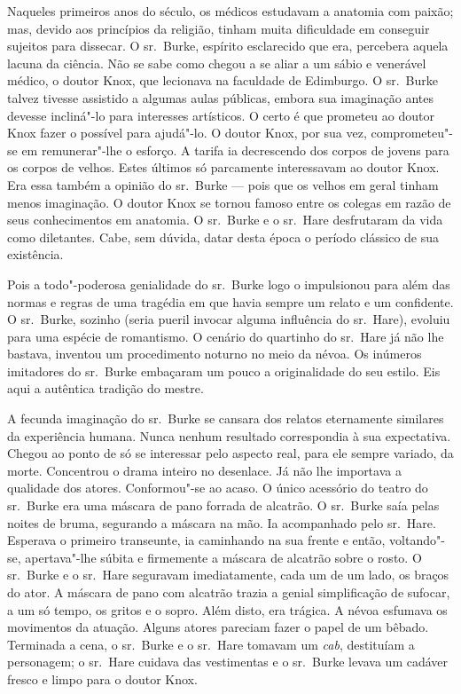 Naqueles primeiros anos do século, os médicos estudavam a anatomia com
paixão; mas, devido aos princípios da religião, tinham muita dificuldade
em conseguir sujeitos para dissecar. O sr.~Burke, espírito esclarecido que
era, percebera aquela lacuna da ciência. Não se sabe como chegou a se
aliar a um sábio e venerável médico, o doutor Knox, que lecionava na
faculdade de Edimburgo. O sr.~Burke talvez tivesse assistido a algumas
aulas públicas, embora sua imaginação antes devesse incliná"-lo para
interesses artísticos. O certo é que prometeu ao doutor Knox fazer o
possível para ajudá"-lo. O doutor Knox, por sua vez, comprometeu"-se em
remunerar"-lhe o esforço. A tarifa ia decrescendo dos corpos de jovens para
os corpos de velhos. Estes últimos só parcamente interessavam ao doutor
Knox. Era essa também a opinião do sr.~Burke --- pois que os velhos em geral
tinham menos imaginação. O doutor Knox se tornou famoso entre os colegas
em razão de seus conhecimentos em anatomia. O sr.~Burke e o sr.~Hare
desfrutaram da vida como diletantes. Cabe, sem dúvida, datar desta época o
período clássico de sua existência.

Pois a todo"-poderosa genialidade do sr.~Burke logo o impulsionou para além
das normas e regras de uma tragédia em que havia sempre um relato e um
confidente. O sr.~Burke, sozinho (seria pueril invocar alguma influência
do sr.~Hare), evoluiu para uma espécie de romantismo. O cenário do
quartinho do sr.~Hare já não lhe bastava, inventou um procedimento noturno
no meio da névoa. Os inúmeros imitadores do sr.~Burke embaçaram um pouco a
originalidade do seu estilo. Eis aqui a autêntica tradição do mestre.

A fecunda imaginação do sr.~Burke se cansara dos relatos eternamente
similares da experiência humana. Nunca nenhum resultado correspondia à sua
expectativa. Chegou ao ponto de só se interessar pelo aspecto real, para
ele sempre variado, da morte. Concentrou o drama inteiro no desenlace. Já
não lhe importava a qualidade dos atores. Conformou"-se ao acaso. O único
acessório do teatro do sr.~Burke era uma máscara de pano forrada de
alcatrão. O sr.~Burke saía pelas noites de bruma, segurando a máscara na
mão. Ia acompanhado pelo sr.~Hare. Esperava o primeiro transeunte, ia
caminhando na sua frente e então, voltando"-se, apertava"-lhe súbita e
firmemente a máscara de alcatrão sobre o rosto. O sr.~Burke e o sr.~Hare
seguravam imediatamente, cada um de um lado, os braços do ator. A máscara
de pano com alcatrão trazia a genial simplificação de sufocar, a um só
tempo, os gritos e o sopro. Além disto, era trágica. A névoa esfumava os
movimentos da atuação. Alguns atores pareciam fazer o papel de um bêbado.
Terminada a cena, o sr.~Burke e o sr.~Hare tomavam um \textit{cab},
destituíam a personagem; o sr.~Hare cuidava das vestimentas e o sr.~Burke
levava um cadáver fresco e limpo para o doutor Knox.

